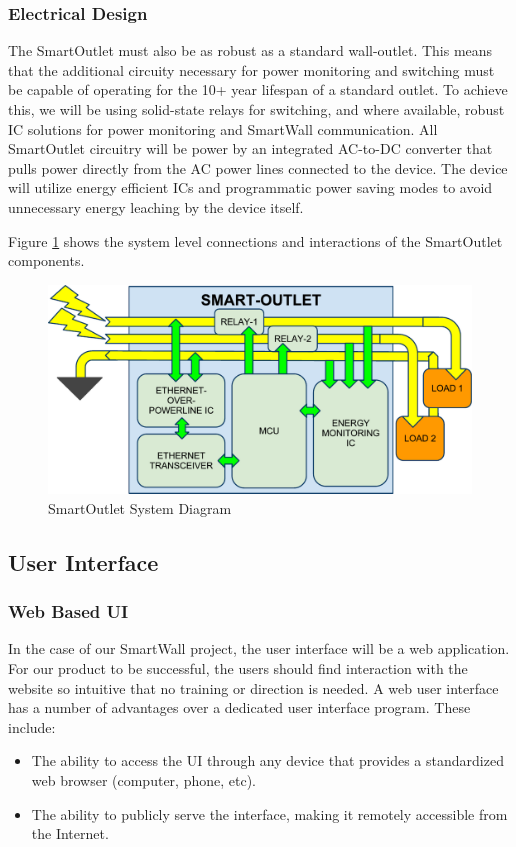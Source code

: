 \documentclass[11pt]{article}
\begin{document}
\subsubsection{Electrical Design}
The SmartOutlet must also be as robust as a standard wall-outlet. This
means that the additional circuity necessary for power monitoring and
switching must be capable of operating for the 10+ year lifespan of
a standard outlet. To achieve this, we will be using solid-state
relays for switching, and where available, robust IC solutions for power
monitoring and SmartWall communication. All SmartOutlet circuitry will be
power by an integrated AC-to-DC converter that pulls power directly
from the AC power lines connected to the device. The device will
utilize energy efficient ICs and programmatic power saving modes to avoid
unnecessary energy leaching by the device itself.

Figure \ref{fig:outletDiagram} shows the system level connections and
interactions of the SmartOutlet components.

\begin{figure}
  \begin{center}
    \includegraphics[scale=.5]{outletdiagram.pdf}
  \end{center}
  \caption{SmartOutlet System Diagram}
  \label{fig:outletDiagram}
\end{figure}

\subsection{User Interface}
\subsubsection{Web Based UI}
In the case of our SmartWall project, the user interface will be a
web application. For our product to be successful, the users
should find interaction with the website so intuitive that no
training or direction is needed. A web user interface has a number of
advantages over a dedicated user interface program. These include:
\begin{itemize}
  \setlength{\itemsep}{0pt}
  \setlength{\parskip}{0pt}
  \setlength{\parsep}{0pt}
\item The ability to access the UI through any device that provides a
  standardized web browser (computer, phone, etc).
\item The ability to publicly serve the interface, making it
  remotely accessible from the Internet.
\end{itemize}  
\end{document}
